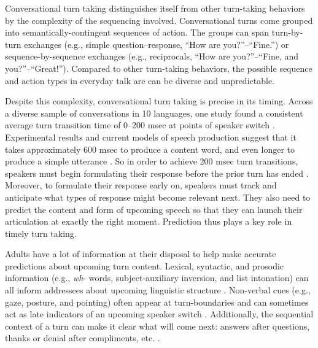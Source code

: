 \documentclass[authoryear, 12pt]{elsarticle}
\begin{document}
Conversational turn taking distinguishes itself from other turn-taking behaviors by the complexity of the sequencing involved. Conversational turns come grouped into semantically-contingent sequences of action. The groups can span turn-by-turn exchanges (e.g., simple question--response, ``How are you?''--``Fine.'') or sequence-by-sequence exchanges (e.g., reciprocals, ``How are you?''--``Fine, and you?''--``Great!''). Compared to other turn-taking behaviors, the possible sequence and action types in everyday talk are can be diverse and unpredictable. 


Despite this complexity, conversational turn taking is precise in its timing. Across a diverse sample of conversations in 10 languages, one study found a consistent average turn transition time of 0--200 msec at points of speaker switch \citep{stivers2009}. Experimental results and current models of speech production suggest that it takes approximately 600 msec to produce a content word, and even longer to produce a simple utterance \citep{griffin2000, levelt1989}. So in order to achieve 200 msec turn transitions, speakers must begin formulating their response before the prior turn has ended \citep{levinson2013, levinson2016}. Moreover, to formulate their response early on, speakers must track and anticipate what types of response might become relevant next. They also need to predict the content and form of upcoming speech so that they can launch their articulation at exactly the right moment. Prediction thus plays a key role in timely turn taking.

Adults have a lot of information at their disposal to help make accurate predictions about upcoming turn content. Lexical, syntactic, and prosodic information (e.g., \textit{wh}- words, subject-auxiliary inversion, and list intonation) can all inform addressees about upcoming linguistic structure \citep{de-ruiter2006, duncan1972, ford1996, torreira2015}. Non-verbal cues (e.g., gaze, posture, and pointing) often appear at turn-boundaries and can sometimes act as late indicators of an upcoming speaker switch \citep{rossano2009, stivers2010}. Additionally, the sequential context of a turn can make it clear what will come next: answers after questions, thanks or denial after compliments, etc. \citep{schegloff2007}.
\end{document}
